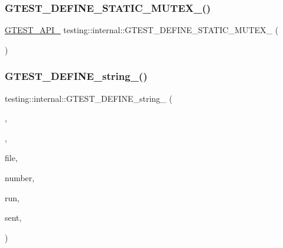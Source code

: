 \mbox{\label{namespacetesting_1_1internal_aff419d76acc3727be48d195f927189c9}} 
\subsubsection{\texorpdfstring{GTEST\_DEFINE\_STATIC\_MUTEX\_()}{GTEST\_DEFINE\_STATIC\_MUTEX\_()}\hspace{0.1cm}{\footnotesize\ttfamily [2/2]}}
{\footnotesize\ttfamily \mbox{\hyperlink{_obj__test_2lib_2googletest-release-1_88_81_2googletest_2include_2gtest_2internal_2gtest-port_8h_aa73be6f0ba4a7456180a94904ce17790}{G\+T\+E\+S\+T\+\_\+\+A\+P\+I\+\_\+}} testing\+::internal\+::\+G\+T\+E\+S\+T\+\_\+\+D\+E\+F\+I\+N\+E\+\_\+\+S\+T\+A\+T\+I\+C\+\_\+\+M\+U\+T\+E\+X\+\_\+ (\begin{DoxyParamCaption}\item[{g\+\_\+linked\+\_\+ptr\+\_\+mutex}]{ }\end{DoxyParamCaption})}

\mbox{\label{namespacetesting_1_1internal_a20bfd9d47d8dd167ffc1c37a4c9ff73e}} 
\subsubsection{\texorpdfstring{GTEST\_DEFINE\_string\_()}{GTEST\_DEFINE\_string\_()}}
{\footnotesize\ttfamily testing\+::internal\+::\+G\+T\+E\+S\+T\+\_\+\+D\+E\+F\+I\+N\+E\+\_\+string\+\_\+ (\begin{DoxyParamCaption}\item[{internal\+\_\+run\+\_\+death\+\_\+test}]{,  }\item[{\char`\"{}\char`\"{}}]{,  }\item[{\char`\"{}Indicates the}]{file,  }\item[{line}]{number,  }\item[{temporal index of \char`\"{} \char`\"{}the single death \mbox{\hyperlink{_mutual_8h_a707ee03719e99670bf6cfdfd897b8456}{test}} to}]{run,  }\item[{and a file descriptor to \char`\"{} \char`\"{}which a success code may be}]{sent,  }\item[{all separated by \char`\"{} \char`\"{}the \textquotesingle{}$\vert$\textquotesingle{} characters. This flag is specified if and only if the current \char`\"{} \char`\"{}process is a sub-\/process launched for running a thread-\/safe \char`\"{} \char`\"{}death test. F\+OR I\+N\+T\+E\+R\+N\+AL U\+SE O\+N\+L\+Y.\char`\"{}}]{ }\end{DoxyParamCaption})}

